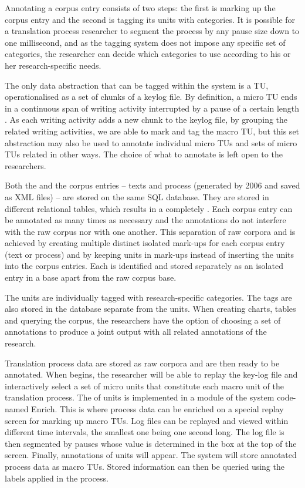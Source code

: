 \documentclass[output=paper]{LSP/langsci}
\begin{document}
Annotating a corpus entry consists of two steps: the first is marking up the corpus entry and the second is tagging its  units with categories. It is possible for a translation process researcher to segment the process by any pause size down to one millisecond, and as the tagging system does not impose any specific set of categories, the researcher can decide which categories to use according to his or her research-specific needs.

The only data abstraction that can be tagged within the  system is a TU, operationalised as a set of chunks of a keylog file. By definition, a micro TU ends in a continuous span of writing activity interrupted by a pause of a certain length \citep{Alves2000}. As each writing activity adds a new chunk to the keylog file, by grouping the related writing activities, we are able to mark and tag the macro TU, but this set abstraction may also be used to annotate individual micro TUs and sets of micro TUs related in other ways. The choice of what to annotate is left open to the researchers.

Both the  and the corpus entries -- texts and process  (generated by  2006 and saved as XML files) -- are stored on the same SQL database. They are stored in different relational tables, which results in a completely . Each corpus entry can be annotated as many times as necessary and the annotations do not interfere with the raw corpus nor with one another. This separation of raw corpora and  is achieved by creating multiple distinct isolated mark-ups for each corpus entry (text or process) and by keeping  units in mark-ups instead of inserting the  units into the corpus entries. Each  is identified and stored separately as an isolated entry in a  base apart from the raw corpus base.

The  units are individually tagged with research-specific categories. The tags are also stored in the database separate from the units. When creating charts, tables and querying the corpus, the researchers have the option of choosing a set of annotations to produce a joint output with all related annotations of the research.

Translation process data are stored as raw corpora and are then ready to be annotated. When  begins, the researcher will be able to replay the key-log file and interactively select a set of micro units that constitute each macro unit of the translation process. The  of  units is implemented in a module of the system code-named Enrich. This is where process data can be enriched on a special replay screen for marking up macro TUs. Log files can be replayed and viewed within different time intervals, the smallest one being one second long. The log file is then segmented by pauses whose value is determined in the box at the top of the screen. Finally, annotations of  units will appear. The system will store annotated process data as macro TUs. Stored information can then be queried using the labels applied in the  process. 
\end{document}

